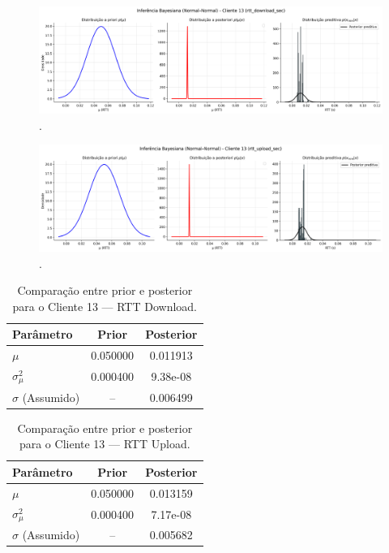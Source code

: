 \documentclass{article}
\begin{document}
\begin{figure}[htp]
	\centering
	\includegraphics[width=\textwidth]{../figures/bayes/rtt_download_sec_bayesian_normalnormal_client13.png}
	\caption{.}
	\label{fig:rtt_download_sec_bayesian_normalnormal_client13}
\end{figure}
\begin{figure}[htp]
	\centering
	\includegraphics[width=\textwidth]{../figures/bayes/rtt_upload_sec_bayesian_normalnormal_client13.png}
	\caption{.}
	\label{fig:rtt_upload_sec_bayesian_normalnormal_client13}
\end{figure}

\begin{table}[htp]
	\centering
	\caption{Comparação entre prior e posterior para o Cliente 13 — RTT Download.}
	\label{tab:bayes_rtt_download_client13}
	\begin{tabular}{lcc}
		\hline
		\textbf{Parâmetro} & \textbf{Prior} & \textbf{Posterior} \\ \hline
		$\mu$ & 0.050000 & 0.011913 \\
		$\sigma^2_{\mu}$ & 0.000400 & 9.38e-08 \\
		$\sigma$ (Assumido) & -- & 0.006499 \\ \hline
	\end{tabular}
\end{table}

\begin{table}[htp]
	\centering
	\caption{Comparação entre prior e posterior para o Cliente 13 — RTT Upload.}
	\label{tab:bayes_rtt_upload_client13}
	\begin{tabular}{lcc}
		\hline
		\textbf{Parâmetro} & \textbf{Prior} & \textbf{Posterior} \\ \hline
		$\mu$ & 0.050000 & 0.013159 \\
		$\sigma^2_{\mu}$ & 0.000400 & 7.17e-08 \\
		$\sigma$ (Assumido) & -- & 0.005682 \\ \hline
	\end{tabular}
\end{table}
\end{document}
